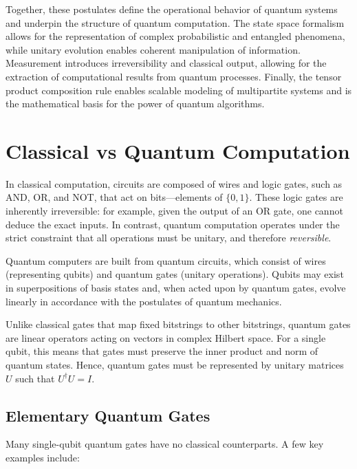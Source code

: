 \documentclass[12pt]{report}
\begin{document}
Together, these postulates define the operational behavior of quantum systems and underpin the structure of quantum computation. The state space formalism allows for the representation of complex probabilistic and entangled phenomena, while unitary evolution enables coherent manipulation of information. Measurement introduces irreversibility and classical output, allowing for the extraction of computational results from quantum processes. Finally, the tensor product composition rule enables scalable modeling of multipartite systems and is the mathematical basis for the power of quantum algorithms.


\section{Classical vs Quantum Computation}


In classical computation, circuits are composed of wires and logic gates, such as AND, OR, and NOT, that act on bits—elements of $\{0,1\}$. These logic gates are inherently irreversible: for example, given the output of an OR gate, one cannot deduce the exact inputs. In contrast, quantum computation operates under the strict constraint that all operations must be unitary, and therefore \emph{reversible}.

Quantum computers are built from quantum circuits, which consist of wires (representing qubits) and quantum gates (unitary operations). Qubits may exist in superpositions of basis states and, when acted upon by quantum gates, evolve linearly in accordance with the postulates of quantum mechanics.

Unlike classical gates that map fixed bitstrings to other bitstrings, quantum gates are linear operators acting on vectors in complex Hilbert space. For a single qubit, this means that gates must preserve the inner product and norm of quantum states. Hence, quantum gates must be represented by unitary matrices $U$ such that $U^\dagger U = I$.

\subsection{Elementary Quantum Gates}

Many single-qubit quantum gates have no classical counterparts. A few key examples include:
\end{document}
